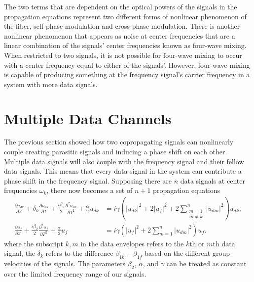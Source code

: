 The two terms that are dependent on the optical powers of the signals in the propagation equations represent two different forms of nonlinear phenomenon of the fiber, self-phase modulation and cross-phase modulation. There is another nonlinear phenomenon that appears as noise at center frequencies that are a linear combination of the signals' center frequencies known as four-wave mixing. When restricted to two signals, it is not possible for four-wave mixing to occur with a center frequency equal to either of the signals'. However, four-wave mixing is capable of producing something at the frequency signal's carrier frequency in a system with more data signals.

\section{Multiple Data Channels} \label{sec:multiple}

The previous section showed how two copropagating signals can nonlinearly couple creating parasitic signals and inducing a phase shift on each other. Multiple data signals will also couple with the frequency signal and their fellow data signals. This means that every data signal in the system can contribute a phase shift in the frequency signal. Supposing there are $n$ data signals at center frequencies $\omega_k$, there now becomes a set of $n+1$ propagation equations
%
\begin{subequations}
\begin{align}
\frac{\partial u_{dk}}{\partial z'} + \delta_k\frac{\partial u_{dk}}{\partial T} + \frac{i\beta_{2}}{2}\frac{\partial^2 u_{dk}}{\partial T^2} + \frac{\alpha}{2}u_{dk} &= i\gamma\left(|u_{dk}|^2 + 2|u_f|^2 + 2\sum_{\substack{m=1\\ m\neq k}}^n|u_{dm}|^2\right)u_{dk}, \label{eq:mdataprop} \\
\frac{\partial u_f}{\partial z'} + \frac{i\beta_{2}}{2}\frac{\partial^2 u_f}{\partial T^2} + \frac{\alpha}{2}u_f &= i\gamma\left(|u_f|^2 + 2\sum_{m=1}^n|u_{dm}|^2\right)u_f. \label{eq:mfreqprop}
\end{align}
\end{subequations}
%
where the subscript $k,m$ in the data envelopes refers to the $k$th or $m$th data signal, the $\delta_k$ refers to the difference $\beta_{1k} - \beta_{1f}$ based on the different group velocities of the signals. The parameters $\beta_2$, $\alpha$, and $\gamma$ can be treated as constant over the limited frequency range of our signals.

